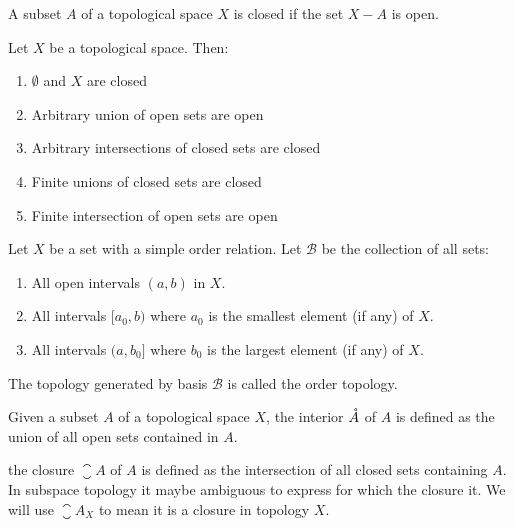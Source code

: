 \begin{definition}
    A subset $A$ of a topological space $X$ is closed if the set $X - A$ is open.
\end{definition}

\begin{definition}
    Let $X$ be a topological space. Then:
    \begin{enumerate}
        \item $\emptyset$ and $X$ are closed
        \item Arbitrary union of open sets are open
        \item Arbitrary intersections of closed sets are closed
        \item Finite unions of closed sets are closed
        \item Finite intersection of open sets are open
    \end{enumerate}
\end{definition}



\begin{definition}
    Let $X$ be a set with a simple order relation. Let $\mathcal{B}$ be the collection of all sets:
    \begin{enumerate}
        \item All open intervals $(a,b)$ in $X$.
        \item All intervals $[a_0, b)$ where $a_0$ is the smallest element (if any) of $X$.
        \item All intervals $(a, b_0]$ where $b_0$ is the largest element (if any) of $X$.
    \end{enumerate}
    The topology generated by basis $\mathcal{B}$ is called the order topology.
\end{definition}



\begin{definition}
    Given a subset $A$ of a topological space $X$, the interior $\mathring{A}$ of $A$ is defined as the union of all open sets contained in $A$.
\end{definition}

\begin{definition}
    the closure $\closure{A}$ of $A$ is defined as the intersection of all closed sets containing $A$. In subspace topology it maybe ambiguous to express for which the closure it. We will use $\closure{A}_X$ to mean it is a closure in topology $X$.
\end{definition}


